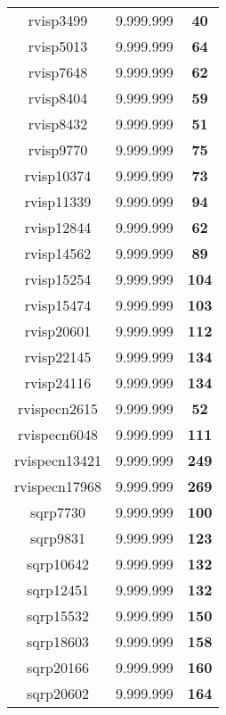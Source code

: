 \begin{tabular}{cc||c}
rvisp3499        & 9.999.999        & {\bf 40}        \\ 
rvisp5013        & 9.999.999        & {\bf 64}        \\ 
rvisp7648        & 9.999.999        & {\bf 62}        \\ 
rvisp8404        & 9.999.999        & {\bf 59}        \\ 
rvisp8432        & 9.999.999        & {\bf 51}        \\ 
rvisp9770        & 9.999.999        & {\bf 75}        \\ 
rvisp10374       & 9.999.999        & {\bf 73}        \\ 
rvisp11339       & 9.999.999        & {\bf 94}        \\ 
rvisp12844       & 9.999.999        & {\bf 62}        \\ 
rvisp14562       & 9.999.999        & {\bf 89}        \\ 
rvisp15254       & 9.999.999        & {\bf 104}       \\ 
rvisp15474       & 9.999.999        & {\bf 103}       \\ 
rvisp20601       & 9.999.999        & {\bf 112}       \\ 
rvisp22145       & 9.999.999        & {\bf 134}       \\ 
rvisp24116       & 9.999.999        & {\bf 134}       \\ 
rvispecn2615     & 9.999.999        & {\bf 52}        \\ 
rvispecn6048     & 9.999.999        & {\bf 111}       \\ 
rvispecn13421    & 9.999.999        & {\bf 249}       \\ 
rvispecn17968    & 9.999.999        & {\bf 269}       \\ 
sqrp7730         & 9.999.999        & {\bf 100}       \\ 
sqrp9831         & 9.999.999        & {\bf 123}       \\ 
sqrp10642        & 9.999.999        & {\bf 132}       \\ 
sqrp12451        & 9.999.999        & {\bf 132}       \\ 
sqrp15532        & 9.999.999        & {\bf 150}       \\ 
sqrp18603        & 9.999.999        & {\bf 158}       \\ 
sqrp20166        & 9.999.999        & {\bf 160}       \\ 
sqrp20602        & 9.999.999        & {\bf 164}       \\ 

\end{tabular}
